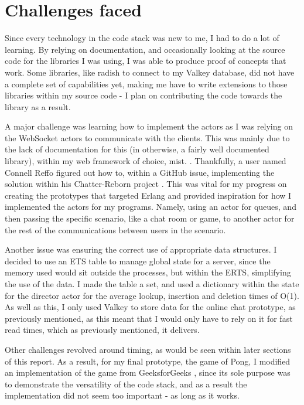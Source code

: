 \documentclass[]{final}
\begin{document}
\section{Challenges faced}

Since every technology in the code stack was new to me, I had to do a lot of learning.
By relying on documentation, and occasionally looking at the source code for
the libraries I was using, I was able to produce proof of concepts that work.
Some libraries, like radish to connect to my Valkey database, did not have
a complete set of capabilities yet, making me have to write extensions to those
libraries within my source code - I plan on contributing the code towards the
library as a result. %

A major challenge was learning how to implement the actors as I was relying on
the WebSocket actors to communicate with the clients. This was mainly due to the
lack of documentation for this (in otherwise, a fairly well documented library),
within my web framework of choice, mist. \cite{noauthor_example_nodate}.
Thankfully, a user named Connell Reffo figured out how to, within a GitHub issue,
implementing the solution within his Chatter-Reborn project \cite{reffo_connellr023/chatter-reborn_2024}.
This was vital for my progress on creating the prototypes that targeted Erlang and
provided inspiration for how I implemented the actors for my programs. Namely,
using an actor for queues, and then passing the specific scenario, like a chat
room or game, to another actor for the rest of the communications
between users in the scenario.

Another issue was ensuring the correct use of appropriate data structures.
I decided to use an ETS table to manage global state for a server, since the
memory used would sit outside the processes, but within the ERTS, simplifying
the use of the data. I made the table a set, and used a dictionary within the
state for the director actor for the average lookup, insertion and deletion
times of O(1). As well as this, I only used Valkey to store data for the
online chat prototype, as previously mentioned, as this meant that I would
only have to rely on it for fast read times, which as previously mentioned,
it delivers.%

Other challenges revolved around timing, as would be seen within later sections
of this report. As a result, for my final prototype, the game of Pong, I
modified an implementation of the game from GeeksforGeeks \cite{GeeksforGeeks_pong_2021}, since its sole
purpose was to demonstrate the versatility of the code stack, and as a result
the implementation did not seem too important - as long as it works.
\end{document}
